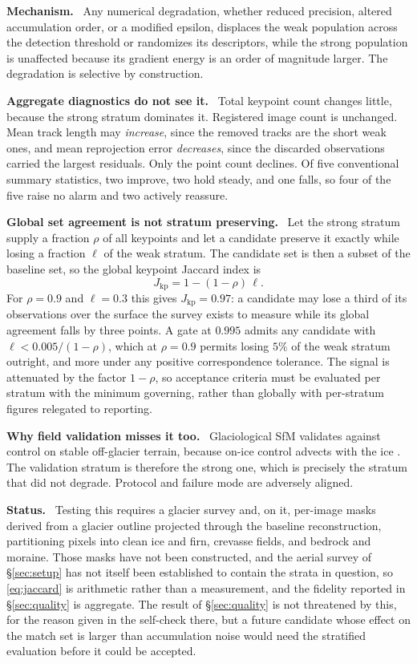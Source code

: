 \documentclass[conference]{IEEEtran}
\newcommand{\para}[1]{\smallskip\noindent\textbf{#1}\ }
\begin{document}
\para{Mechanism.} Any numerical degradation, whether reduced precision, altered
accumulation order, or a modified epsilon, displaces the weak population across
the detection threshold or randomizes its descriptors, while the strong
population is unaffected because its gradient energy is an order of magnitude
larger. The degradation is selective by construction.

\para{Aggregate diagnostics do not see it.} Total keypoint count changes little,
because the strong stratum dominates it. Registered image count is unchanged.
Mean track length may \emph{increase}, since the removed tracks are the short
weak ones, and mean reprojection error \emph{decreases}, since the discarded
observations carried the largest residuals. Only the point count declines. Of
five conventional summary statistics, two improve, two hold steady, and one
falls, so four of the five raise no alarm and two actively reassure.

\para{Global set agreement is not stratum preserving.} Let the strong stratum
supply a fraction $\rho$ of all keypoints and let a candidate preserve it exactly
while losing a fraction $\ell$ of the weak stratum. The candidate set is then a
subset of the baseline set, so the global keypoint Jaccard index is
\begin{equation}
J_{\mathrm{kp}} = 1 - (1-\rho)\,\ell .
\label{eq:jaccard}
\end{equation}
For $\rho = 0.9$ and $\ell = 0.3$ this gives $J_{\mathrm{kp}} = 0.97$: a
candidate may lose a third of its observations over the surface the survey exists
to measure while its global agreement falls by three points. A gate at $0.995$
admits any candidate with $\ell < 0.005/(1-\rho)$, which at $\rho = 0.9$ permits
losing $5\%$ of the weak stratum outright, and more under any positive
correspondence tolerance. The signal is attenuated by the factor $1-\rho$, so
acceptance criteria must be evaluated per stratum with the minimum governing,
rather than globally with per-stratum figures relegated to reporting.

\para{Why field validation misses it too.} Glaciological SfM validates against
control on stable off-glacier terrain, because on-ice control advects with the
ice \cite{chudley2019high}. The validation stratum is therefore the strong one,
which is precisely the stratum that did not degrade. Protocol and failure mode
are adversely aligned.

\para{Status.} Testing this requires a glacier survey and, on it, per-image
masks derived from a glacier outline projected through the baseline
reconstruction, partitioning pixels into clean ice and firn, crevasse fields,
and bedrock and moraine. Those masks have not been constructed, and the aerial
survey of \S\ref{sec:setup} has not itself been established to contain the
strata in question, so \eqref{eq:jaccard} is arithmetic rather than a
measurement, and the fidelity reported in \S\ref{sec:quality} is aggregate. The
result of \S\ref{sec:quality} is not threatened by this, for the reason given in
the self-check there, but a future candidate whose effect on the match set is
larger than accumulation noise would need the stratified evaluation before it
could be accepted.
\end{document}
